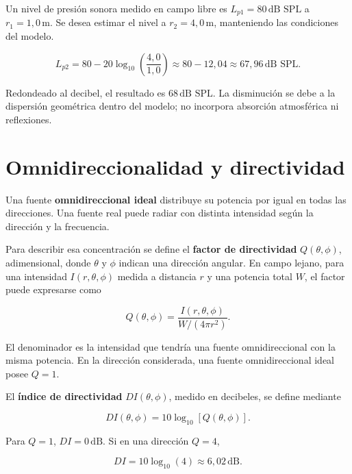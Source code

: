 Un nivel de presión sonora medido en campo libre es
\(L_{p1}=80\,\text{dB SPL}\) a \(r_1=1{,}0\,\text{m}\). Se desea estimar el
nivel a \(r_2=4{,}0\,\text{m}\), manteniendo las condiciones del modelo.

\[
    L_{p2}
      =80-20\log_{10}\!\left(\frac{4{,}0}{1{,}0}\right)
      \approx80-12{,}04
      \approx67{,}96\,\text{dB SPL}.
\]

Redondeado al decibel, el resultado es \(68\,\text{dB SPL}\). La disminución
se debe a la dispersión geométrica dentro del modelo; no incorpora absorción
atmosférica ni reflexiones.

\section{Omnidireccionalidad y directividad}
\label{sec:u4-directividad}

Una fuente \textbf{omnidireccional ideal} distribuye su potencia por igual en
todas las direcciones. Una fuente real puede radiar con distinta intensidad
según la dirección y la frecuencia.

Para describir esa concentración se define el \textbf{factor de directividad}
\(Q(\theta,\phi)\), adimensional, donde \(\theta\) y \(\phi\) indican una
dirección angular. En campo lejano, para una intensidad
\(I(r,\theta,\phi)\) medida a distancia \(r\) y una potencia total \(W\), el
factor puede expresarse como~\cite{xiangBlauert2021}

\begin{equation}
    Q(\theta,\phi)
      =\frac{I(r,\theta,\phi)}
             {W/(4\pi r^2)}.
    \label{eq:u4-factor-directividad}
\end{equation}

El denominador es la intensidad que tendría una fuente omnidireccional con la
misma potencia. En la dirección considerada, una fuente omnidireccional ideal
posee \(Q=1\).

El \textbf{índice de directividad} \(DI(\theta,\phi)\), medido en decibeles, se
define mediante

\begin{equation}
    DI(\theta,\phi)
      =10\log_{10}\!\left[Q(\theta,\phi)\right].
    \label{eq:u4-indice-directividad}
\end{equation}

Para \(Q=1\), \(DI=0\,\text{dB}\). Si en una dirección \(Q=4\),
\nopagebreak[4]

\[
    DI=10\log_{10}(4)\approx6{,}02\,\text{dB}.
\]

